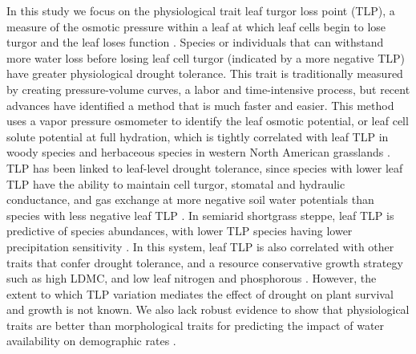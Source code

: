 \documentclass[12pt, letterpaper]{article}
\begin{document}
In this study we focus on the physiological trait leaf turgor loss point (TLP), a measure of the osmotic pressure within a leaf at which leaf cells begin to lose turgor and the leaf loses function \citep{Bartlett2012a, Bartletta2016TheDrought}. Species or individuals that can withstand more water loss  before losing leaf cell turgor (indicated by a more negative TLP) have greater physiological drought tolerance. This trait is traditionally measured by creating pressure-volume curves, a labor and time-intensive process, but recent advances have identified a method that is much faster and easier. This method uses a vapor pressure osmometer to identify the leaf osmotic potential, or leaf cell solute potential at full hydration, which is tightly correlated with leaf TLP in woody species \citep{Bartlett2012} and herbaceous species in western North American grasslands \citep{Griffin-Nolan2019}. TLP has been linked to leaf-level drought tolerance, since species with lower leaf TLP have the ability to maintain cell turgor, stomatal and hydraulic conductance, and gas exchange at more negative soil water potentials than species with less negative leaf TLP \citep{Bartlett2012a}. In semiarid shortgrass steppe, leaf TLP is predictive of species abundances, with lower TLP species having lower precipitation sensitivity \citep{Wilcox2020PlantPrairie}. In this system, leaf TLP is also correlated with other traits that confer drought tolerance, and a resource conservative growth strategy such as high LDMC, and low leaf nitrogen and phosphorous \citep{Blumenthal2020}. However, the extent to which TLP variation mediates the effect of drought on plant survival and growth is not known. We also lack robust evidence to show that physiological traits are better than morphological traits for predicting the impact of water availability on demographic rates . 

\end{document}
